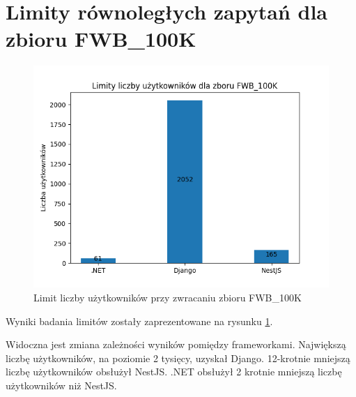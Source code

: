 \section{Limity równoległych zapytań dla zbioru FWB\_100K}

\begin{figure}[!hb]
	\centering \includegraphics[width=1\linewidth]{rysunki/Limity_liczby_uzytkownikow_dla_zboru_FWB_100K.png}
	\caption{Limit liczby użytkowników przy zwracaniu zbioru FWB\_100K}
	\label{rys:limit_vus_fwb_100K}
\end{figure}

Wyniki badania limitów zostały zaprezentowane na rysunku \ref{rys:limit_vus_fwb_100K}.

Widoczna jest zmiana zależności wyników pomiędzy frameworkami.
Największą liczbę użytkowników, na poziomie 2 tysięcy, uzyskał Django.
12-krotnie mniejszą liczbę użytkowników obsłużył NestJS.
.NET obsłużył 2 krotnie mniejszą liczbę użytkowników niż NestJS.